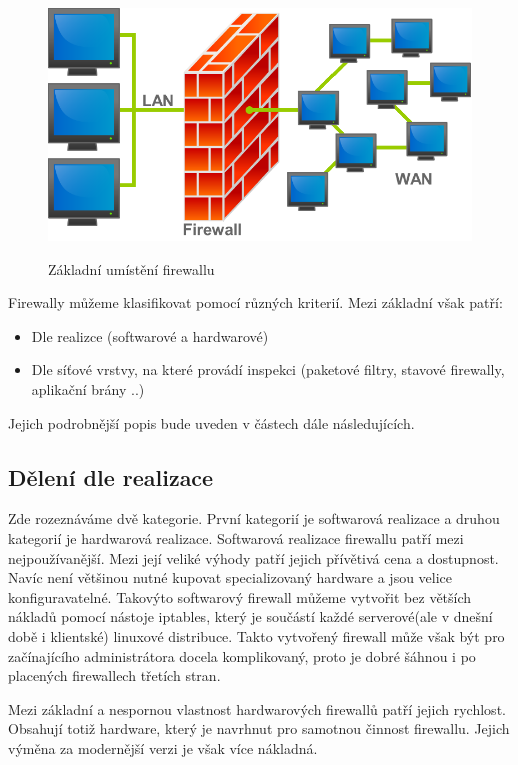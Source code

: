 \documentclass[11pt,twoside,a4paper]{article}
\begin{document}
\begin{figure}[ht]
	\center
	\includegraphics[scale=0.3]{./pict/firewall.png}
	\label{pic:firewall_base}
	\caption{Základní umístění firewallu \cite{ref:wiki_firewall}}
\end{figure}

Firewally můžeme klasifikovat pomocí různých kriterií. Mezi základní však patří:
\begin{itemize}
	\item Dle realizce (softwarové a hardwarové)
	\item Dle síťové vrstvy, na které provádí inspekci (paketové filtry, stavové firewally, aplikační brány ..)
\end{itemize} 

Jejich podrobnější popis bude uveden v částech dále následujících.

\subsection{Dělení dle realizace}
Zde rozeznáváme dvě kategorie. První kategorií je softwarová realizace a druhou kategorií je hardwarová realizace. Softwarová realizace firewallu patří mezi nejpoužívanější. Mezi její veliké výhody patří jejich přívětivá cena a dostupnost. Navíc není většinou nutné kupovat specializovaný hardware a jsou velice konfiguravatelné. Takovýto softwarový firewall můžeme vytvořit bez větších nákladů pomocí nástoje iptables, který je součástí každé serverové(ale v dnešní době i klientské) linuxové distribuce. Takto vytvořený firewall může však být pro začínajícího administrátora docela komplikovaný, proto je dobré šáhnou i po placených firewallech třetích stran.

Mezi základní a nespornou vlastnost hardwarových firewallů patří jejich rychlost. Obsahují totiž hardware, který je navrhnut pro samotnou činnost firewallu. Jejich výměna za modernější verzi je však více nákladná.
\end{document}
